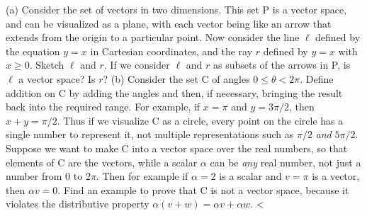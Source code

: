 (a) Consider the set of vectors in two dimensions. This set P is a
vector space, and can be visualized as a plane, with each vector being
like an arrow that extends from the origin to a particular point. Now
consider the line $\ell$ defined by the equation $y=x$ in Cartesian
coordinates, and the ray $r$ defined by $y=x$ with $x\ge0$. Sketch
$\ell$ and $r$.  If we consider $\ell$ and $r$ as subsets of the
arrows in P, is $\ell$ a vector space? Is $r$?\hwendpart
%
(b) Consider the set C of angles $0\le\theta<2\pi$. Define addition on
C by adding the angles and then, if necessary, bringing the result
back into the required range. For example, if $x=\pi$ and $y=3\pi/2$,
then $x+y=\pi/2$.  Thus if we visualize C as a circle, every point on
the circle has a single number to represent it, not multiple
representations such as $\pi/2$ \emph{and} $5\pi/2$.  Suppose we want
to make C into a vector space over the real numbers, so that elements
of C are the vectors, while a scalar $\alpha$ can be \emph{any} real
number, not just a number from $0$ to $2\pi$. Then for example if
$\alpha=2$ is a scalar and $v=\pi$ is a vector, then $\alpha v=0$.
Find an example to prove that C is not a vector space, because it
violates the distributive property $\alpha(v+w)=\alpha v+\alpha
w$.\hwendpart
<%
